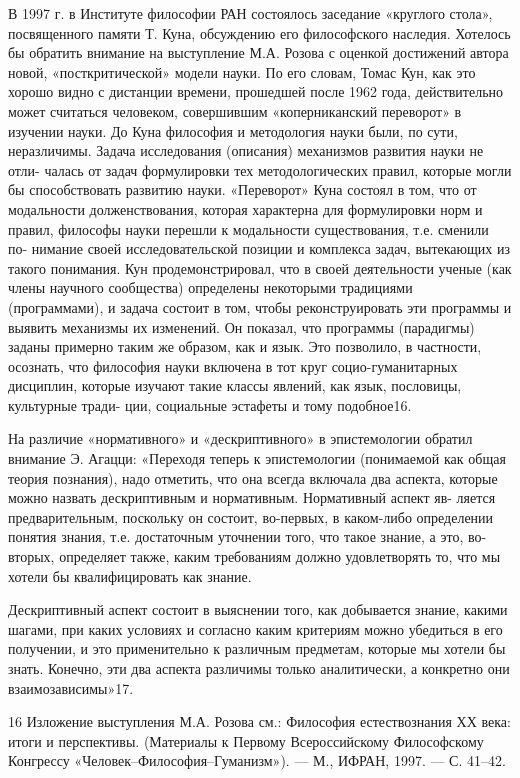 \documentclass[11pt,a4paper]{article}
\begin{document}
В 1997 г. в Институте философии РАН состоялось заседание «круглого стола»,
посвященного памяти Т. Куна, обсуждению его философского наследия. Хотелось бы
обратить внимание на выступление М.А. Розова с оценкой достижений автора
новой, «посткритической» модели науки. По его словам, Томас Кун, как это
хорошо видно с дистанции времени, прошедшей после 1962 года, действительно
может считаться человеком, совершившим «коперниканский переворот» в изучении
науки. До Куна философия и методология науки были, по сути,
неразличимы. Задача исследования (описания) механизмов развития науки не отли-
чалась от задач формулировки тех методологических правил, которые могли бы
способствовать развитию науки. «Переворот» Куна состоял в том, что от
модальности долженствования, которая характерна для формулировки норм и
правил, философы науки перешли к модальности существования, т.е. сменили по-
нимание своей исследовательской позиции и комплекса задач, вытекающих из
такого понимания. Кун продемонстрировал, что в своей деятельности ученые (как
члены научного сообщества) определены некоторыми традициями (программами), и
задача состоит в том, чтобы реконструировать эти программы и выявить
механизмы их изменений. Он показал, что программы (парадигмы) заданы
примерно таким же образом, как и язык. Это позволило, в частности, осознать,
что философия науки включена в тот круг социо-гуманитарных дисциплин,
которые изучают такие классы явлений, как язык, пословицы, культурные тради-
ции, социальные эстафеты и тому подобное16.

На различие «нормативного» и «дескриптивного» в эпистемологии обратил
внимание Э. Агацци: «Переходя теперь к эпистемологии (понимаемой как общая
теория познания), надо отметить, что она всегда включала два аспекта,
которые можно назвать дескриптивным и нормативным. Нормативный аспект яв-
ляется предварительным, поскольку он состоит, во-первых, в каком-либо
определении понятия знания, т.е. достаточным уточнении того, что такое знание,
а это, во-вторых, определяет также, каким требованиям должно удовлетворять
то, что мы хотели бы квалифицировать как знание.

Дескриптивный аспект состоит в выяснении того, как добывается знание, какими
шагами, при каких условиях и согласно каким критериям можно убедиться в его
получении, и это применительно к различным предметам, которые мы хотели бы
знать. Конечно, эти два аспекта различимы только аналитически, а конкретно
они взаимозависимы»17.

16 Изложение выступления М.А. Розова см.: Философия естествознания ХХ века:
итоги и перспективы. (Материалы к Первому Всероссийскому Философскому
Конгрессу «Человек–Философия–Гуманизм»). — М., ИФРАН, 1997. — С. 41–42.
\end{document}
